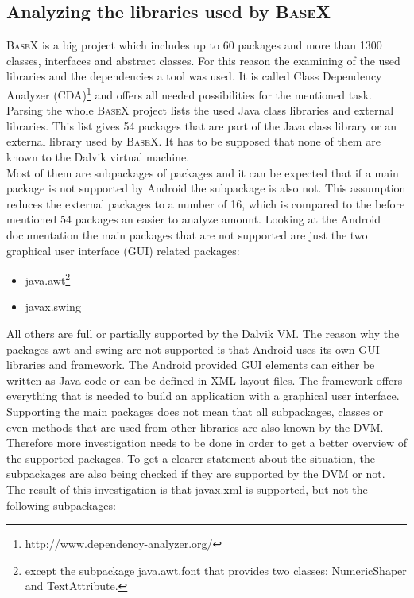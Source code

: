 \subsection{Analyzing the libraries used by \textsc{BaseX}}
\label{sec:migration:analyzing-the-libraries-used-by-basex}
\textsc{BaseX} is a big project which includes up to 60 packages and more than 1300 classes, interfaces and abstract classes.
For this reason the examining of the used libraries and the dependencies a tool was used.
It is called Class Dependency Analyzer (CDA)\footnote{http://www.dependency-analyzer.org/} and offers all needed possibilities for the mentioned task.
Parsing the whole \textsc{BaseX} project lists the used Java class libraries and external libraries.
This list gives 54 packages that are part of the Java class library or an external library used by \textsc{BaseX}.
It has to be supposed that none of them are known to the Dalvik virtual machine.\\
Most of them are subpackages of packages and it can be expected that if a main package is not supported by Android the subpackage is also not. 
This assumption reduces the external packages to a number of 16, which is compared to the before mentioned 54 packages an easier to analyze amount.
Looking at the Android documentation the main packages that are not supported are just the two graphical user interface (GUI) related packages:
\begin{itemize}
  \item java.awt\footnote{except the subpackage java.awt.font that provides two classes: NumericShaper and TextAttribute.}
  \item javax.swing
\end{itemize}
All others are full or partially supported by the Dalvik VM.
The reason why the packages awt and swing are not supported is that Android uses its own GUI libraries and framework.
The Android provided GUI elements can either be written as Java code or can be defined in XML layout files.
The framework offers everything that is needed to build an application with a graphical user interface.\\
Supporting the main packages does not mean that all subpackages, classes or even methods that are used from other libraries are also known by the DVM.
Therefore more investigation needs to be done in order to get a better overview of the supported packages.
To get a clearer statement about the situation, the subpackages are also being checked if they are supported by the DVM or not.
The result of this investigation is that javax.xml is supported, but not the following subpackages:
